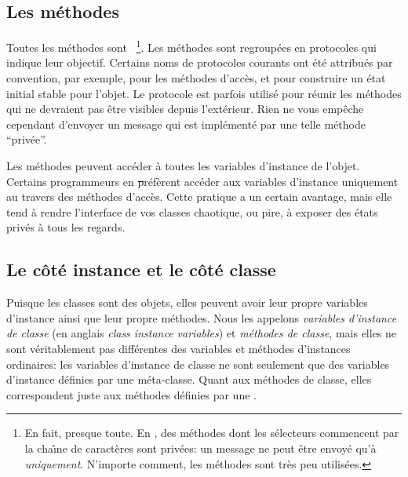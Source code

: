 \documentclass[a4paper,10pt,twoside]{book}
\begin{document}
\subsection{Les m\'ethodes}

Toutes les m\'ethodes sont ~\footnote{En fait, presque toute.  En \squeak, des m\'ethodes dont les s\'electeurs commencent par
la cha\^{\i}ne de caract\`eres  sont priv\'ees: un message 
ne peut \^etre envoy\'e qu'\`a \self \emph{uniquement}.  N'importe comment, les m\'ethodes  sont tr\`es peu utilis\'ees.}.
Les m\'ethodes sont regroup\'ees en protocoles qui indique leur objectif.
Certains noms de protocoles courants ont \'et\'e attribu\'es par convention,
par exemple,  pour les m\'ethodes d'acc\`es, et  pour construire un \'etat initial stable pour l'objet.
Le protocole  est parfois utilis\'e pour r\'eunir les
m\'ethodes qui ne devraient pas \^etre visibles depuis l'ext\'erieur.
Rien ne vous emp\^eche cependant d'envoyer un message qui est impl\'ement\'e
par une telle m\'ethode ``priv\'ee''.

Les m\'ethodes peuvent acc\'eder \`a toutes les variables d'instance de l'objet.
Certains programmeurs en \st pr\'ef\`erent acc\'eder aux variables d'instance
uniquement au travers des m\'ethodes d'acc\`es.
Cette pratique a un certain avantage, mais elle tend \`a rendre l'interface de vos classes chaotique, ou pire, \`a exposer des \'etats priv\'es \`a tous les regards.

\subsection{Le c\^ot\'e instance et le c\^ot\'e classe}

Puisque les classes sont des objets, elles peuvent avoir leur propre variables d'instance ainsi que leur propre m\'ethodes.
Nous les appelons \emph{variables d'instance de classe} (en anglais \emph{class instance variables}) et \emph{m\'ethodes de classe}, mais elles ne sont v\'eritablement pas diff\'erentes des variables et m\'ethodes d'instances ordinaires:
les variables d'instance de classe ne sont seulement que des variables d'instance d\'efinies par une m\'eta-classe. Quant aux m\'ethodes de classe,
elles correspondent juste aux m\'ethodes d\'efinies par une . 
\end{document}
